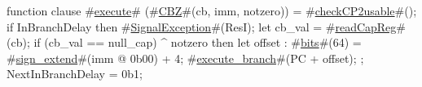 function clause #\hyperref[zexecute]{execute}# (#\hyperref[zCBZ]{CBZ}#(cb, imm, notzero)) =
{
  #\hyperref[zcheckCP2usable]{checkCP2usable}#();
  if InBranchDelay then
     #\hyperref[zSignalException]{SignalException}#(ResI);
  let cb_val = #\hyperref[zreadCapReg]{readCapReg}#(cb);
  if (cb_val == null_cap) ^ notzero then
  {
    let offset : #\hyperref[zbits]{bits}#(64) = #\hyperref[zsignzyextend]{sign\_extend}#(imm @ 0b00) + 4;
    #\hyperref[zexecutezybranch]{execute\_branch}#(PC + offset);
  };
  NextInBranchDelay = 0b1;
}
